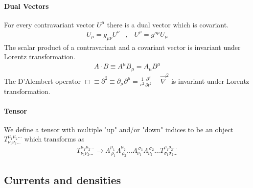 \paragraph{Dual Vectors} For every contravariant vector $U^\mu$ there
is a dual vector which is covariant.
\begin{align*}
    U_\mu = g_{\mu \nu} U^\nu
    \hspace{10pt} , \hspace{10pt}
    U^\rho = g^{\rho \mu} U_\mu
\end{align*}
The scalar product of a contravariant and a covariant vector is invariant
under Lorentz transformation.
\begin{align*}
    A \cdot B \equiv A^\mu B_\mu = A_\mu B^\mu
\end{align*}
The D'Alembert operator $\Box \equiv \partial^2 \equiv \partial_\mu \partial^\mu
= \frac{1}{c^2} \frac{\partial^2}{\partial t^2} - \vec{\nabla}^2$ is invariant
under Lorentz transformation.

\paragraph{Tensor} We define a tensor with multiple "up" and/or "down"
indices to be an object $T^{\mu_1 \mu_2 \dots}_{\nu_1 \nu_2 \dots}$
which transforms as
\begin{align*}
    T_{\nu_1 \nu_2 \dots}^{\mu_1 \mu_2 \dots} \rightarrow
    \Lambda_{\ \rho_1}^{\mu_1} \Lambda_{\ \rho_2}^{\mu_2} \dots
    \Lambda_{\nu_1}^{\ \sigma_1} \Lambda_{\nu_2}^{\ \sigma_2} \dots
    T_{\sigma_1 \sigma_2 \dots}^{\rho_1 \rho_2 \dots}
\end{align*}

\subsection{Currents and densities}

